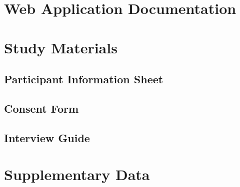 \documentclass[12pt, a4paper, twoside]{report}
\begin{document}
\appendix

\chapter{Web Application Documentation}
\label{app:webapp}


\chapter{Study Materials}
\label{app:materials}

\section{Participant Information Sheet}
\section{Consent Form}
\section{Interview Guide}

\chapter{Supplementary Data}
\label{app:data}

\end{document}
